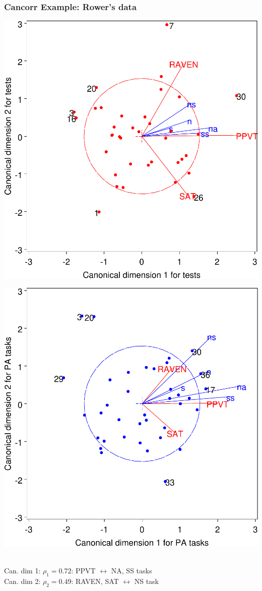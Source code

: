 \begin{frame}
  \frametitle{Cancorr Example: Rower's data}

\begin{center}
 \begin{minipage}[c]{.49\linewidth}
  \includegraphics[width=1\linewidth,clip]{fig/canppvt11}
 \end{minipage}%
 \hfill
 \begin{minipage}[c]{.49\linewidth}
  \includegraphics[width=1\linewidth,clip]{fig/canppvt12}
 \end{minipage}
 \\ Can. dim 1:  $\rho_1 = 0.72$:  PPVT $\longleftrightarrow$ NA, SS tasks
 \\ Can. dim 2:  $\rho_2 = 0.49$:  RAVEN, SAT $\longleftrightarrow$ NS task
 \end{center}

\end{frame}
